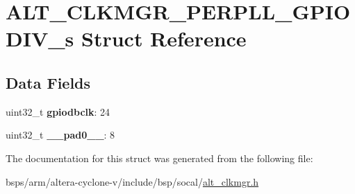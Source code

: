 \hypertarget{structALT__CLKMGR__PERPLL__GPIODIV__s}{}\section{A\+L\+T\+\_\+\+C\+L\+K\+M\+G\+R\+\_\+\+P\+E\+R\+P\+L\+L\+\_\+\+G\+P\+I\+O\+D\+I\+V\+\_\+s Struct Reference}
\label{structALT__CLKMGR__PERPLL__GPIODIV__s}
\subsection*{Data Fields}
\begin{DoxyCompactItemize}
\item 
\mbox{\label{structALT__CLKMGR__PERPLL__GPIODIV__s_a73183caed08afae10d1dd254ceecf075}} 
uint32\+\_\+t {\bfseries gpiodbclk}\+: 24
\item 
\mbox{\label{structALT__CLKMGR__PERPLL__GPIODIV__s_a70f867590a984827eca5877bb2bd29ae}} 
uint32\+\_\+t {\bfseries \+\_\+\+\_\+pad0\+\_\+\+\_\+}\+: 8
\end{DoxyCompactItemize}


The documentation for this struct was generated from the following file\+:\begin{DoxyCompactItemize}
\item 
bsps/arm/altera-\/cyclone-\/v/include/bsp/socal/\mbox{\hyperlink{alt__clkmgr_8h}{alt\+\_\+clkmgr.\+h}}\end{DoxyCompactItemize}
